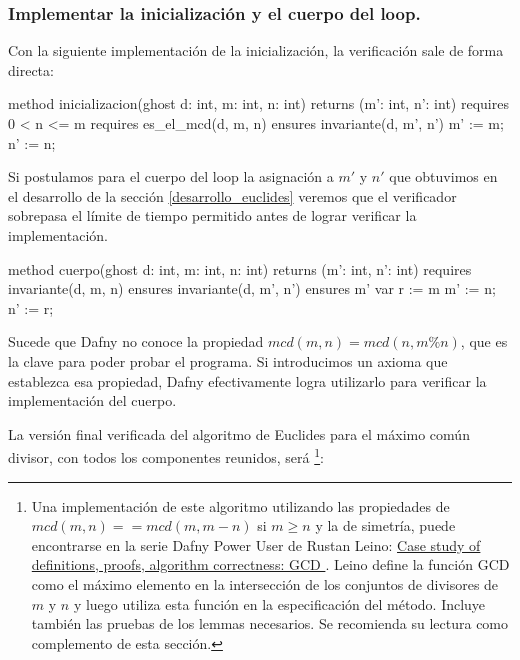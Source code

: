 \documentclass[12pt, a4paper, openany, fleqn]{book}
\begin{document}
    \subsubsection{Implementar la inicialización y el cuerpo del loop.}

    Con la siguiente implementación de la inicialización, la verificación sale de forma directa:
    \begin{dafny}
method inicializacion(ghost d: int, m: int, n: int)
    returns (m': int, n': int)
    requires 0 < n <= m
    requires es_el_mcd(d, m, n)
    ensures invariante(d, m', n')
    {
        m' := m;
        n' := n;
    }
    \end{dafny}

    Si postulamos para el cuerpo del loop la asignación a $m'$ y $n'$ que obtuvimos en el desarrollo de la sección \ref{desarrollo_euclides} veremos que el verificador sobrepasa el límite de tiempo permitido antes de lograr verificar la implementación.

    \begin{dafny}
method cuerpo(ghost d: int, m: int, n: int)
    returns (m': int, n': int)
    requires invariante(d, m, n)
    ensures invariante(d, m', n')
    ensures m' %
{
    var r := m %
    m' := n;
    n' := r;
}
    \end{dafny}

    Sucede que Dafny no conoce la propiedad $mcd(m, n) = mcd(n, m\%n)$, que es la clave para poder probar el programa. Si introducimos un axioma que establezca esa propiedad, Dafny efectivamente logra utilizarlo para verificar la implementación del cuerpo.


    La versión final verificada del algoritmo de Euclides para el máximo común divisor, con todos los componentes reunidos, será \footnote{
    Una implementación de este algoritmo utilizando las propiedades de $mcd(m, n) == mcd(m, m - n)$ si $m \ge n$ y la de simetría, puede encontrarse en la serie Dafny Power User de Rustan Leino: \href{https://leino.science/papers/krml279.html}{Case study of definitions, proofs, algorithm correctness: GCD
    }. Leino define la función GCD como el máximo elemento en la intersección de los conjuntos de divisores de $m$ y $n$ y luego utiliza esta función en la especificación del método. Incluye también las pruebas de los lemmas necesarios. Se recomienda su lectura como complemento de esta sección.}:
\end{document}
